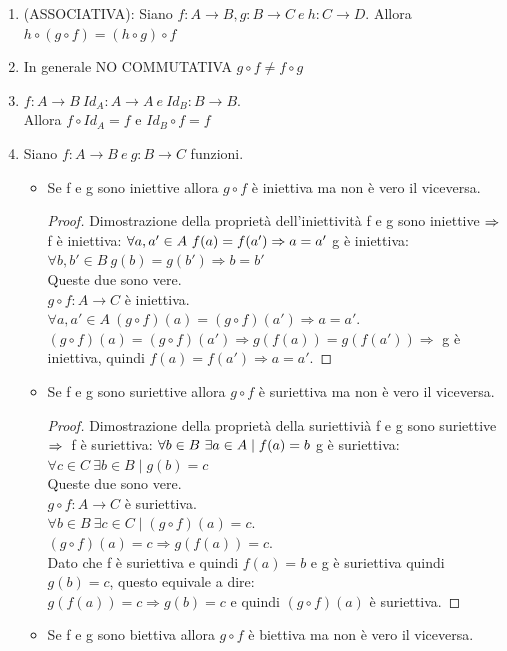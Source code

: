 \documentclass[12pt, letterpaper]{report}
\begin{document}
	\begin{enumerate}
		\item (ASSOCIATIVA): Siano $f: A \to B, g: B \to C \ e \ h: C \to D$. Allora $h \circ (g \circ f) = (h \circ g) \circ f$
		\item In generale NO COMMUTATIVA $g \circ f \neq f \circ g$
		\item $f: A \to B \ Id_A: A \to A \ e \ Id_B: B \to B$. \\ Allora $f \circ Id_A = f$ e $Id_B \circ f = f$
		\item Siano $f: A \to B \ e \ g: B \to C$ funzioni.
			\begin{itemize}
				\item Se f e g sono iniettive allora $g \circ f$ è iniettiva ma non è vero il viceversa.
				\begin{proof}{Dimostrazione della proprietà dell'iniettività}
					f e g sono iniettive $\Rightarrow \\$ f è iniettiva: $\forall a, a' \in A \ f(a) = f(a') \Rightarrow a = a' \\$ g è iniettiva: $\forall b, b' \in B \ g(b) = g(b') \Rightarrow b = b'$ \\ Queste due sono vere.
					\\
					$g \circ f: A \to C$ è iniettiva. \\
					$\forall a, a' \in A \ (g \circ f)(a) = (g \circ f)(a') \Rightarrow a = a'$.
					\\
					$(g \circ f)(a) = (g \circ f)(a') \Rightarrow g(f(a)) = g(f(a')) \Rightarrow $ g è iniettiva, quindi $f(a) = f(a') \Rightarrow a = a'$.
				\end{proof}
				\newpage
				\item Se f e g sono suriettive allora $g \circ f$ è suriettiva ma non è vero il viceversa.
				\begin{proof}{Dimostrazione della proprietà della suriettivià}
					f e g sono suriettive $\Rightarrow \\$ f è suriettiva: $\forall b \in B \ \exists a \in A \mid f(a) = b \\$ g è suriettiva: $\forall c \in C \ \exists b \in B \mid g(b) = c$ \\ Queste due sono vere.
					\\
					$g \circ f: A \to C$ è suriettiva. \\
					$\forall b \in B \ \exists c \in C \mid (g \circ f)(a) = c$.
					\\
					$(g \circ f)(a) = c \Rightarrow g(f(a)) = c$. \\
					Dato che f è suriettiva e quindi $f(a) = b$ e g è suriettiva quindi $g(b) = c$, questo equivale a dire:
					\\
					$g(f(a)) = c \Rightarrow g(b) = c$ e quindi $(g \circ f)(a)$ è suriettiva.
				\end{proof}
				\item Se f e g sono biettiva allora $g \circ f$ è biettiva ma non è vero il viceversa.
			\end{itemize}
	\end{enumerate}
\end{document}
